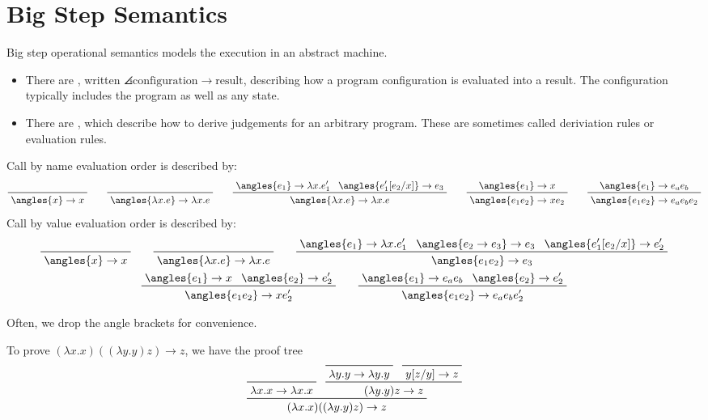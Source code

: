 \documentclass[class=scrartcl]{standalone}
\begin{document}

\section{Big Step Semantics}
Big step operational semantics models the execution in an abstract machine.
\begin{itemize}
  \item There are ,
        written \(\angles{\text{configuration}} \to \text{result}\),
        describing how a program configuration is evaluated into a result.
        The configuration typically includes the program as well as any state.
  \item There are ,
        which describe how to derive judgements for an arbitrary program.
        These are sometimes called deriviation rules or evaluation rules.
\end{itemize}

\begin{example}
  Call by name evaluation order is described by:
  \[
    \prfaxiom{\angles{x} \to x} \qquad
    \prfaxiom{\angles{\lambda x. e} \to \lambda x. e} \qquad
    \prftree{\angles{e_1} \to \lambda x. e_1'}
            {\angles{e_1'[e_2 / x]} \to e_3}
            {\angles{\lambda x. e} \to \lambda x. e} \qquad
    \prftree{\angles{e_1} \to x}
            {\angles{e_1 e_2} \to x e_2} \qquad
    \prftree{\angles{e_1} \to e_a e_b}
            {\angles{e_1 e_2} \to e_a e_b e_2}
  \]
  Call by value evaluation order is described by:
  \begin{gather*}
    \prfaxiom{\angles{x} \to x} \qquad
    \prfaxiom{\angles{\lambda x. e} \to \lambda x. e} \qquad
    \prftree{\angles{e_1} \to \lambda x. e_1'}
            {\angles{e_2 \to e_3} \to e_3}
            {\angles{e_1'[e_2 / x]} \to e_2'}
            {\angles{e_1 e_2} \to e_3}\\
    \prftree{\angles{e_1} \to x}
            {\angles{e_2} \to e_2'}
            {\angles{e_1 e_2} \to x e_2'} \qquad
    \prftree{\angles{e_1} \to e_a e_b}
            {\angles{e_2} \to e_2'}
            {\angles{e_1 e_2} \to e_a e_b e_2'}
  \end{gather*}
\end{example}
Often, we drop the angle brackets for convenience.

\begin{example}
  To prove \((\lambda x. x)((\lambda y.y) z) \to z\), we have the proof tree
  \[
    \prftree{\prfaxiom{\lambda x. x \to \lambda x. x}}
            {\prftree{\prfaxiom{\lambda y. y \to \lambda y. y}}
                     {\prfaxiom{y[z / y] \to z}}
                     {(\lambda y. y) z \to z}
            }
            {(\lambda x. x)((\lambda y.y) z) \to z}
  \]
\end{example}
\end{document}
